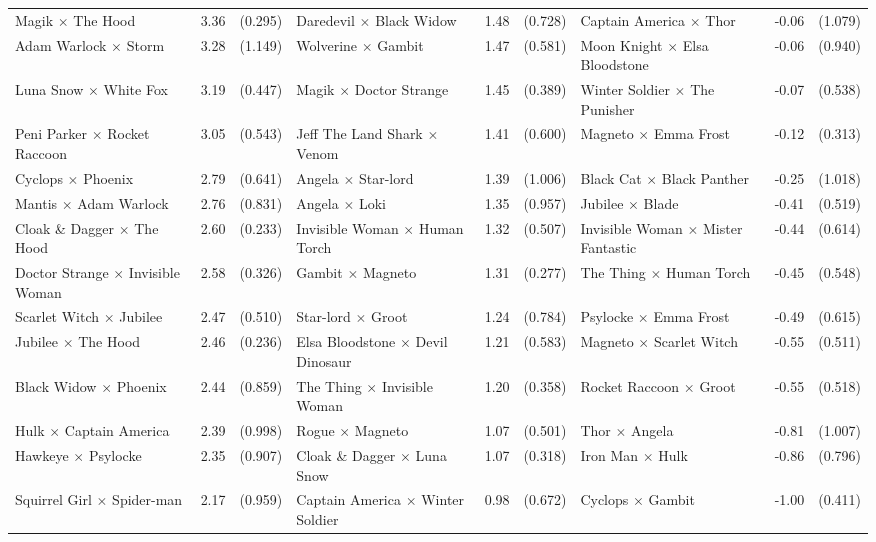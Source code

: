 \documentclass[11pt]{article}
\begin{document}
\begin{landscape}
\begin{center}
{\begin{tabular}{l r r @{\hspace{1.4em}} l r r @{\hspace{1.4em}} l r r}
Magik $\times$ The Hood & 3.36 & (0.295) & Daredevil $\times$ Black Widow & 1.48 & (0.728) & Captain America $\times$ Thor & -0.06 & (1.079) \\
Adam Warlock $\times$ Storm & 3.28 & (1.149) & Wolverine $\times$ Gambit & 1.47 & (0.581) & Moon Knight $\times$ Elsa Bloodstone & -0.06 & (0.940) \\
Luna Snow $\times$ White Fox & 3.19 & (0.447) & Magik $\times$ Doctor Strange & 1.45 & (0.389) & Winter Soldier $\times$ The Punisher & -0.07 & (0.538) \\
Peni Parker $\times$ Rocket Raccoon & 3.05 & (0.543) & Jeff The Land Shark $\times$ Venom & 1.41 & (0.600) & Magneto $\times$ Emma Frost & -0.12 & (0.313) \\
Cyclops $\times$ Phoenix & 2.79 & (0.641) & Angela $\times$ Star-lord & 1.39 & (1.006) & Black Cat $\times$ Black Panther & -0.25 & (1.018) \\
Mantis $\times$ Adam Warlock & 2.76 & (0.831) & Angela $\times$ Loki & 1.35 & (0.957) & Jubilee $\times$ Blade & -0.41 & (0.519) \\
Cloak \& Dagger $\times$ The Hood & 2.60 & (0.233) & Invisible Woman $\times$ Human Torch & 1.32 & (0.507) & Invisible Woman $\times$ Mister Fantastic & -0.44 & (0.614) \\
Doctor Strange $\times$ Invisible Woman & 2.58 & (0.326) & Gambit $\times$ Magneto & 1.31 & (0.277) & The Thing $\times$ Human Torch & -0.45 & (0.548) \\
Scarlet Witch $\times$ Jubilee & 2.47 & (0.510) & Star-lord $\times$ Groot & 1.24 & (0.784) & Psylocke $\times$ Emma Frost & -0.49 & (0.615) \\
Jubilee $\times$ The Hood & 2.46 & (0.236) & Elsa Bloodstone $\times$ Devil Dinosaur & 1.21 & (0.583) & Magneto $\times$ Scarlet Witch & -0.55 & (0.511) \\
Black Widow $\times$ Phoenix & 2.44 & (0.859) & The Thing $\times$ Invisible Woman & 1.20 & (0.358) & Rocket Raccoon $\times$ Groot & -0.55 & (0.518) \\
Hulk $\times$ Captain America & 2.39 & (0.998) & Rogue $\times$ Magneto & 1.07 & (0.501) & Thor $\times$ Angela & -0.81 & (1.007) \\
Hawkeye $\times$ Psylocke & 2.35 & (0.907) & Cloak \& Dagger $\times$ Luna Snow & 1.07 & (0.318) & Iron Man $\times$ Hulk & -0.86 & (0.796) \\
Squirrel Girl $\times$ Spider-man & 2.17 & (0.959) & Captain America $\times$ Winter Soldier & 0.98 & (0.672) & Cyclops $\times$ Gambit & -1.00 & (0.411) \\

\end{tabular}}
\end{center}
\end{landscape}
\end{document}
